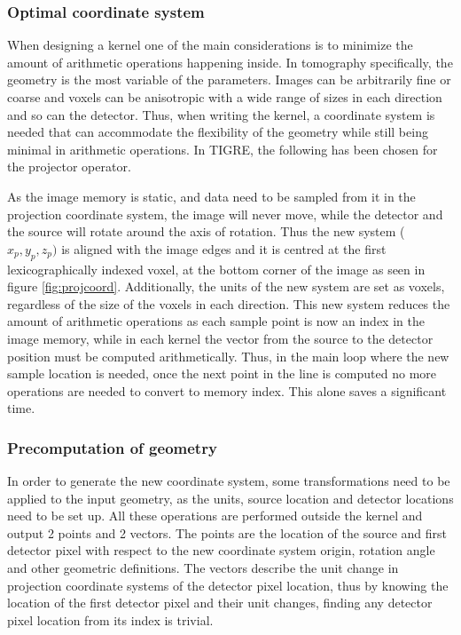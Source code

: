 \subsubsection{Optimal coordinate system}

When designing a kernel one of the main considerations is to minimize the amount of arithmetic operations happening inside. In tomography specifically, the geometry is the most variable of the parameters. Images can be arbitrarily fine or coarse and voxels can be anisotropic with a wide range of sizes in each direction and so can the detector. Thus, when writing the kernel, a coordinate system is needed that can accommodate the flexibility of the geometry while still being minimal in arithmetic operations. In TIGRE, the following has been chosen for the projector operator.

As the image memory is static, and data need to be sampled from it in the projection coordinate system, the image will never move, while the detector and the source will rotate around the axis of rotation. Thus the new system ($x_p,y_p,z_p)$ is aligned with the image edges and it is centred at the first lexicographically indexed voxel, at the bottom corner of the image as seen in figure \ref{fig:projcoord}.  Additionally, the units of the new system are set as voxels, regardless of the size of the voxels in each direction. This new system reduces the amount of arithmetic operations as each sample point is now an index in the image memory, while in each kernel the vector from the source to the detector position must be computed arithmetically. Thus, in the main loop where the new sample location is needed, once the next point in the line is computed no more operations are needed to convert to memory index. This alone saves a significant time.


\subsubsection{Precomputation of geometry}

In order to generate the new coordinate system, some transformations need to be applied to the input geometry, as the units, source location and detector locations need to be set up. All these operations are performed outside the kernel and output 2 points and 2 vectors. The points are the location of the source and first detector pixel with respect to the new coordinate system origin, rotation angle and other geometric definitions. The vectors describe the unit change in projection coordinate systems of the detector pixel location, thus by knowing the location of the first detector pixel and their unit changes, finding any detector pixel location from its index is trivial.

